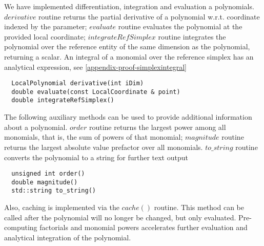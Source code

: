 \noindent
We have implemented differentiation, integration and evaluation a polynomials. $derivative$ routine returns the partial derivative of a polynomial w.r.t. coordinate indexed by the parameter; $evaluate$ routine evaluates the polynomial at the provided local coordinate; $integrateRefSimplex$ routine integrates the polynomial over the reference entity of the same dimension as the polynomial, returning a scalar. An integral of a monomial over the reference simplex has an analytical expression, see \ref{appendix-proof-simplexintegral}

\begin{mybox}
\begin{lstlisting}
  LocalPolynomial derivative(int iDim)
  double evaluate(const LocalCoordinate & point)
  double integrateRefSimplex()
\end{lstlisting}
\end{mybox}

\noindent
The following auxiliary methods can be used to provide additional information about a polynomial. $order$ routine returns the largest power among all monomials, that is, the sum of powers of that monomial;
$magnitude$ routine returns the largest absolute value prefactor over all monomials. $to\_string$ routine converts the polynomial to a string for further text output

\begin{mybox}
\begin{lstlisting}
  unsigned int order()
  double magnitude()
  std::string to_string()
\end{lstlisting}
\end{mybox}

\noindent
Also, caching is implemented via the $cache()$ routine. This method can be called after the polynomial will no longer be changed, but only evaluated. Pre-computing factorials and monomial powers accelerates further evaluation and analytical integration of the polynomial.





